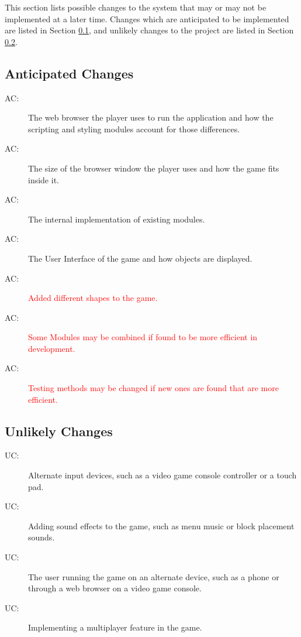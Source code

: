 \documentclass[12pt, titlepage]{article}
\newcounter{acnum}
\newcommand{\actheacnum}{AC\theacnum}
\newcounter{ucnum}
\newcommand{\uctheucnum}{UC\theucnum}
\begin{document}
This section lists possible changes to the system that may or may not be implemented at a later time. Changes which are anticipated to be implemented are listed in Section \ref{SecAchange}, and
unlikely changes to the project are listed in Section \ref{SecUchange}.

\subsection{Anticipated Changes} \label{SecAchange}

\begin{description}
\item[ \actheacnum \label{acBrowser}:] 
The web browser the player uses to run the application and how the scripting and styling modules account for those differences.
\item[ \actheacnum \label{acWindow}:] 
The size of the browser window the player uses and how the game fits inside it.
\item[ \actheacnum \label{acModules}:] 
The internal implementation of existing modules.
\item[ \actheacnum \label{acUI}:] 
The User Interface of the game and how objects are displayed.
\item[ \actheacnum \label{acGF}:] 
\textcolor{red}{Added different shapes to the game.}
\item[ \actheacnum \label{acModules}:] 
\textcolor{red}{Some Modules may be combined if found to be more efficient in development.}
\item[ \actheacnum \label{acTesting}:] 
\textcolor{red}{Testing methods may be changed if new ones are found that are more efficient.}


\end{description}

\subsection{Unlikely Changes} \label{SecUchange}

\begin{description}
\item[ \uctheucnum \label{ucInput}:] 
Alternate input devices, such as a video game console controller or a touch pad.
\item[ \uctheucnum \label{ucAudio}:] 
Adding sound effects to the game, such as menu music or block placement sounds.
\item[ \uctheucnum \label{ucDevice}:] 
The user running the game on an alternate device, such as a phone or through a web browser on a video game console.
\item[ \uctheucnum \label{ucPlayers}:] 
Implementing a multiplayer feature in the game.
\end{description}
\end{document}
